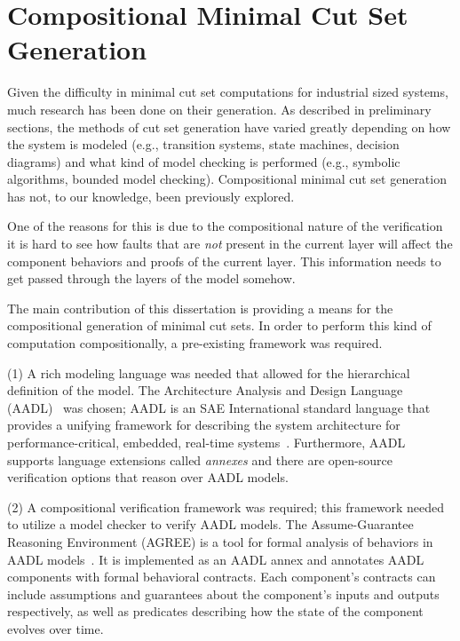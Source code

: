 \chapter{Compositional Minimal Cut Set Generation}
\label{chap:mcsGen}

Given the difficulty in minimal cut set computations for industrial sized systems, much research has been done on their generation. As described in preliminary sections, the methods of cut set generation have varied greatly depending on how the system is modeled (e.g., transition systems, state machines, decision diagrams) and what kind of model checking is performed (e.g., symbolic algorithms, bounded model checking). Compositional minimal cut set generation has not, to our knowledge, been previously explored.

One of the reasons for this is due to the compositional nature of the verification it is hard to see how faults that are {\em not} present in the current layer will affect the component behaviors and proofs of the current layer. This information needs to get passed through the layers of the model somehow. 

The main contribution of this dissertation is providing a means for the compositional generation of minimal cut sets. In order to perform this kind of computation compositionally, a pre-existing framework was required. 

(1) A rich modeling language was needed that allowed for the hierarchical definition of the model. The Architecture Analysis and Design Language (AADL)~\cite{aerospace2012sae} was chosen; AADL is an SAE International standard language that provides a unifying framework for describing the system architecture for performance-critical, embedded, real-time systems~\cite{AADL_Standard,FeilerModelBasedEngineering2012}. Furthermore, AADL supports language extensions called {\em annexes} and there are open-source verification options that reason over AADL models.

(2) A compositional verification framework was required; this framework needed to utilize a model checker to verify AADL models. The Assume-Guarantee Reasoning Environment (AGREE) is a tool for formal analysis of behaviors in AADL models~\cite{NFM2012:CoGaMiWhLaLu}.  It is implemented as an AADL annex and annotates AADL components with formal behavioral contracts. Each component's contracts can include assumptions and guarantees about the component's inputs and outputs respectively, as well as predicates describing how the state of the component evolves over time.

